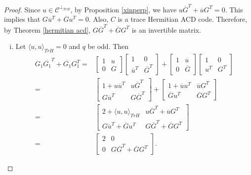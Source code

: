 \documentclass[10pt,a4paper]{amsart}
\begin{document}
\begin{proof}
	Since $u\in \mathcal{C}^{\perp_{TrH}}$, by Proposition \ref{xinperp}, we have $u\overline{G}^T+\overline{u}G^T=0.$ This implies that $G\overline{u}^T+\overline{G}u^T=0.$ Also, $C$ is a trace Hermitian ACD code. Therefore, by Theorem \ref{hermitian acd}, $G\overline{G}^T+ \overline{G}G^T$ is an invertible matrix. 
	\begin{enumerate}[(i)]
		\item Let $\langle u,u\rangle_{TrH}=0$ and $q$ be odd. Then
		\begin{align*}
			G_1 \overline{G_1}^T+\overline{G_1}G_1^T=&\begin{bmatrix}
				1 & u\\
				0 & G
			\end{bmatrix}
			\begin{bmatrix}
				1 & 0 \\
				\overline{u}^T & \overline{G}^T
			\end{bmatrix}+\begin{bmatrix}
				1 & \overline{u}\\
				0 & \overline{G}
			\end{bmatrix}
			\begin{bmatrix}
				1 & 0\\
				u^T & G^T
			\end{bmatrix}\\
			=&\begin{bmatrix}
				1+u\overline{u}^T & u\overline{G}^T\\
				G\overline{u}^T & G\overline{G}^T
			\end{bmatrix}+
			\begin{bmatrix}
				1+\overline{u}u^T &\overline{u}G^T \\
				\overline{G}u^T & \overline{G}G^T
			\end{bmatrix}\\
			=&\begin{bmatrix}
				2+\langle u,u\rangle_{TrH} & u\overline{G}^T+\overline{u}G^T \\
				G\overline{u}^T+\overline{G}u^T &G\overline{G}^T+ \overline{G}G^T
			\end{bmatrix}\\
			=&\begin{bmatrix}
				2 & 0\\
				0 &G\overline{G}^T+ \overline{G}G^T
			\end{bmatrix}.
		\end{align*} 
		

\end{enumerate}
\end{proof}
\end{document}
